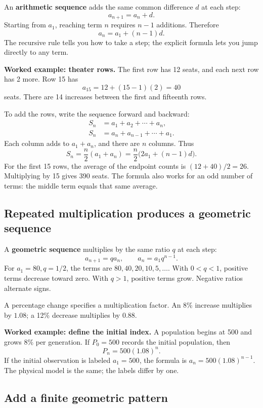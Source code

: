 An \textbf{arithmetic sequence} adds the same common difference \(d\) at each step: \[
a_{n+1}=a_n+d.
\] Starting from \(a_1\), reaching term \(n\) requires \(n-1\) additions. Therefore \[
a_n=a_1+(n-1)d.
\] The recursive rule tells you how to take a step; the explicit formula lets you jump directly to any term.

\textbf{Worked example: theater rows.} The first row has 12 seats, and each next row has 2 more. Row 15 has \[
a_{15}=12+(15-1)(2)=40
\] seats. There are 14 increases between the first and fifteenth rows.

To add the rows, write the sequence forward and backward: \[
\begin{aligned}
S_n&=a_1+a_2+\cdots+a_n,\\
S_n&=a_n+a_{n-1}+\cdots+a_1.
\end{aligned}
\] Each column adds to \(a_1+a_n\), and there are \(n\) columns. Thus \[
S_n=\frac n2(a_1+a_n)
=\frac n2\bigl(2a_1+(n-1)d\bigr).
\] For the first 15 rows, the average of the endpoint counts is \((12+40)/2=26\). Multiplying by 15 gives 390 seats. The formula also works for an odd number of terms: the middle term equals that same average.

\hypertarget{m9-repeated-multiplication-produces-a-geometric-sequence}{%
\subsection{Repeated multiplication produces a geometric sequence}\label{m9-repeated-multiplication-produces-a-geometric-sequence}}

A \textbf{geometric sequence} multiplies by the same ratio \(q\) at each step: \[
a_{n+1}=qa_n,\qquad a_n=a_1q^{n-1}.
\] For \(a_1=80,q=1/2\), the terms are \(80,40,20,10,5,\ldots\). With \(0<q<1\), positive terms decrease toward zero. With \(q>1\), positive terms grow. Negative ratios alternate signs.

A percentage change specifies a multiplication factor. An 8\% increase multiplies by \(1.08\); a 12\% decrease multiplies by \(0.88\).

\textbf{Worked example: define the initial index.} A population begins at 500 and grows 8\% per generation. If \(P_0=500\) records the initial population, then \[
P_n=500(1.08)^n.
\] If the initial observation is labeled \(a_1=500\), the formula is \(a_n=500(1.08)^{n-1}\). The physical model is the same; the labels differ by one.

\hypertarget{m9-add-a-finite-geometric-pattern}{%
\subsection{Add a finite geometric pattern}\label{m9-add-a-finite-geometric-pattern}}

